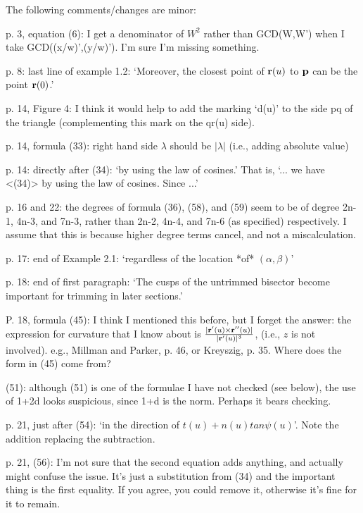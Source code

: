 
The following comments/changes are minor:

p. 3, equation (6): I get a denominator of $W^2$ rather than 
	GCD(W,W') when I take GCD((x/w)',(y/w)').  I'm sure I'm missing
	something.

p. 8: last line of example 1.2: `Moreover, the closest point of 
${\bf r}(u)$ to ${\bf p}$ can be the point ${\bf r}(0)$.'

p. 14, Figure 4: I think it would help to add the marking `d(u)'
to the side pq of the triangle (complementing this mark on the qr(u) side).

p. 14, formula (33): right hand side $\lambda$ should be $|\lambda|$
			(i.e., adding absolute value)

p. 14: directly after (34): `by using the law of cosines.'
	That is, `... we have <(34)> by using the law of cosines.  Since ...'

p. 16 and 22:
	the degrees of formula (36), (58), and (59) seem to be of degree 
	2n-1, 4n-3, and 7n-3, rather than 2n-2, 4n-4, and 7n-6 (as specified)
	respectively.
	I assume that this is because higher degree terms cancel,
	and not a miscalculation.

p. 17: end of Example 2.1: `regardless of the location *of* $(\alpha,\beta)$'

p. 18: end of first paragraph: `The cusps of the untrimmed bisector become
	important for trimming in later sections.'

P. 18, formula (45): I think I mentioned this before, but I forget the answer:
	the expression for curvature that I know about is 
	$\frac{|{\bf r}'(u) \times {\bf r}''(u)|}{|{\bf r}'(u)|^3}$,
	(i.e., $z$ is not involved).
	e.g., Millman and Parker, p. 46, or Kreyszig, p. 35.
	Where does the form in (45) come from?

(51): although (51) is one of the formulae I have not checked (see below),
	the use of 1+2\kappa d looks suspicious, since 1+\kappa d is the norm.
	Perhaps it bears checking.

p. 21, just after (54): `in the direction of $t(u) + n(u) tan \psi(u)$'.
	Note the addition replacing the subtraction.

p. 21, (56): I'm not sure that the second equation adds anything,
	and actually might confuse the issue.
	It's just a substitution from (34) and the important
	thing is the first equality.  If you agree, you could remove it,
	otherwise it's fine for it to remain.

